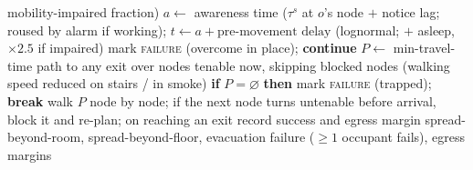 \begin{algorithm}[htbp]
\begin{algorithmic}[1]
mobility-impaired fraction)
  \State $a \gets$ awareness time ($\tau^s$ at $o$'s node $+$ notice lag; roused
  by alarm if working); $t \gets a + \text{pre-movement delay}$
  (lognormal; $+$ asleep, $\times 2.5$ if impaired)
   \State mark
  \textsc{failure} (overcome in place); \textbf{continue}
  \EndIf
  \Repeat {}
    \State $P \gets$ min-travel-time path to any exit over nodes tenable now,
    skipping blocked nodes (walking speed reduced on stairs / in smoke)
    \State \textbf{if} $P=\varnothing$ \textbf{then} mark \textsc{failure}
    (trapped); \textbf{break}
    \State walk $P$ node by node; if the next node turns untenable before arrival,
    block it and re-plan; on reaching an exit record success and egress margin
\EndFor
\State \Return spread-beyond-room, spread-beyond-floor, evacuation failure
($\ge 1$ occupant fails), egress margins
\end{algorithmic}
\end{algorithm}

